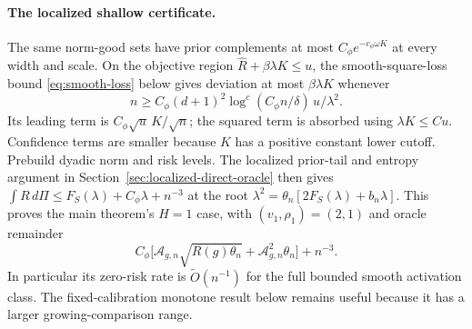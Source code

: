 \paragraph{The localized shallow certificate.}
The same norm-good sets have prior complements at most $C_\phi e^{-c_\phi\omega K}$ at every width and scale. On the objective region $\widehat R+\beta\lambda K\le u$, the smooth-square-loss bound \eqref{eq:smooth-loss} below gives deviation at most $\beta\lambda K$ whenever
\[
 n\ge C_\phi(d+1)^2\log^c(C_\phi n/\delta)\,u/\lambda^2.
\]
Its leading term is $C_\phi\sqrt u\,K/\sqrt n$; the squared term is absorbed using $\lambda K\le C u$. Confidence terms are smaller because $K$ has a positive constant lower cutoff. Prebuild dyadic norm and risk levels. The localized prior-tail and entropy argument in Section~\ref{sec:localized-direct-oracle} then gives $\int R\,d\Pi\le F_S(\lambda)+C_\phi\lambda+n^{-3}$ at the root $\lambda^2=\theta_n[2F_S(\lambda)+b_n\lambda]$. This proves the main theorem's $H=1$ case, with $(v_1,\rho_1)=(2,1)$ and oracle remainder
\[
 C_\phi\big[\mathcal A_{g,n}\sqrt{R(g)\theta_n}+\mathcal A_{g,n}^2\theta_n\big]+n^{-3}.
\]
In particular its zero-risk rate is $\widetilde O(n^{-1})$ for the full bounded smooth activation class. The fixed-calibration monotone result below remains useful because it has a larger growing-comparison range.


